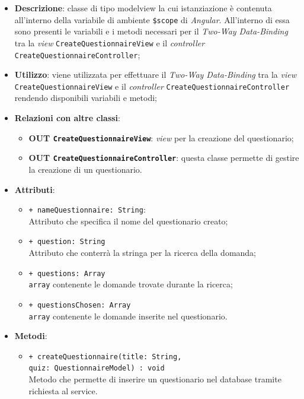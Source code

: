 	\begin{itemize}
		\item \textbf{Descrizione}: classe di tipo modelview la cui istanziazione è contenuta all'interno della variabile di ambiente \texttt{\$scope} di \textit{Angular}. All'interno di essa sono presenti le variabili e i metodi necessari per il \textit{Two-Way Data-Binding} tra la \textit{view} \texttt{CreateQuestionnaireView} e il \textit{controller} \texttt{CreateQuestionnaireController};
		\item \textbf{Utilizzo}: viene utilizzata per effettuare il \textit{Two-Way Data-Binding} tra la \textit{view}\\ \texttt{CreateQuestionnaireView} e il \textit{controller} \texttt{CreateQuestionnaireController} rendendo disponibili variabili e metodi;
		\item \textbf{Relazioni con altre classi}: 
		\begin{itemize}
			\item \textbf{OUT \texttt{CreateQuestionnaireView}}: \textit{view} per la creazione del questionario; 
			\item \textbf{OUT \texttt{CreateQuestionnaireController}}: questa classe permette di gestire la creazione di un questionario.
		\end{itemize}
		\item \textbf{Attributi}: 
		\begin{itemize}
			\item \texttt{+ nameQuestionnaire: String}: \\ Attributo che specifica il nome del questionario creato;
			\item \texttt{+ question: String} \\ Attributo che conterrà la stringa per la ricerca della domanda;
			\item \texttt{+ questions: Array} \\ \texttt{array} contenente le domande trovate durante la ricerca;
			\item \texttt{+ questionsChosen: Array} \\ \texttt{array} contenente le domande inserite nel questionario.
		\end{itemize}
		\item \textbf{Metodi}: 
		\begin{itemize}
			\item \texttt{+ createQuestionnaire(title: String, \\quiz: QuestionnaireModel) : void} \\Metodo che permette di inserire un questionario nel database tramite richiesta al service. \\

\end{itemize}
\end{itemize}
